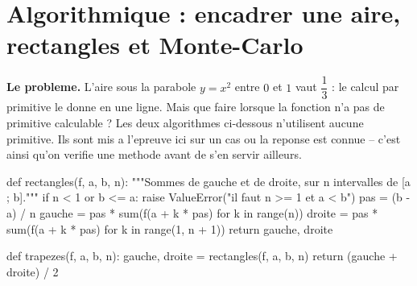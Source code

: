 
\section{Algorithmique : encadrer une aire, rectangles et Monte-Carlo}



\textbf{Le probleme.} L'aire sous la parabole $y = x^2$ entre $0$ et $1$ vaut
$\dfrac{1}{3}$ : le calcul par primitive le donne en une ligne. Mais que faire
lorsque la fonction n'a pas de primitive calculable ? Les deux algorithmes
ci-dessous n'utilisent aucune primitive. Ils sont mis a l'epreuve ici sur un
cas ou la reponse est connue -- c'est ainsi qu'on verifie une methode avant de
s'en servir ailleurs.


\begin{python}
def rectangles(f, a, b, n):
    """Sommes de gauche et de droite, sur n intervalles de [a ; b]."""
    if n < 1 or b <= a:
        raise ValueError("il faut n >= 1 et a < b")
    pas = (b - a) / n
    gauche = pas * sum(f(a + k * pas) for k in range(n))
    droite = pas * sum(f(a + k * pas) for k in range(1, n + 1))
    return gauche, droite

def trapezes(f, a, b, n):
    gauche, droite = rectangles(f, a, b, n)
    return (gauche + droite) / 2
\end{python}

